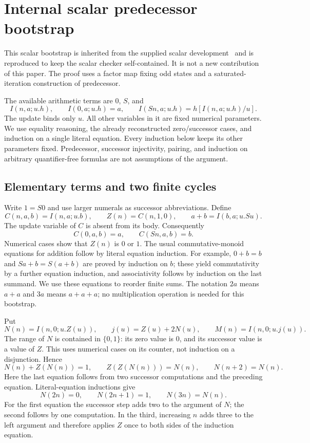 \documentclass[11pt,letterpaper]{article}
\theoremstyle{definition}\newtheorem{definition}[theorem]{Definition}
\theoremstyle{remark}\newtheorem{remark}[theorem]{Remark}
\begin{document}
\section{Internal scalar predecessor bootstrap}
\label{sec:hybrid-bootstrap}

This scalar bootstrap is inherited from the supplied scalar development~\cite{erasure} and is reproduced to keep the scalar checker self-contained. It is not a new contribution of this paper. The proof uses a factor map fixing odd states and a saturated-iteration construction of predecessor.

The available arithmetic terms are $0$, $S$, and
\[
 I(n,a;u.h),\qquad
 I(0,a;u.h)=a,\qquad
 I(Sn,a;u.h)=h[I(n,a;u.h)/u].
\]
The update binds only $u$.  All other variables in it are fixed numerical
parameters.  We use equality reasoning, the already reconstructed
zero/successor cases, and induction on a single literal equation.
Every induction below keeps its other parameters fixed.  Predecessor,
successor injectivity, pairing, and induction on arbitrary
quantifier-free formulas are not assumptions of the argument.

\subsection{Elementary terms and two finite cycles}

Write $1=S0$ and use larger numerals as successor abbreviations.  Define
\[
 C(n,a,b)=I(n,a;u.b),\qquad
 Z(n)=C(n,1,0),\qquad
 a+b=I(b,a;u.Su).
\]
The update variable of $C$ is absent from its body.  Consequently
\[
 C(0,a,b)=a,\qquad C(Sn,a,b)=b.
\]
Numerical cases show that $Z(n)$ is $0$ or $1$.
The usual commutative-monoid equations for addition follow by literal
equation induction.  For example, $0+b=b$ and $Sa+b=S(a+b)$ are
proved by induction on $b$; these yield commutativity by a further
equation induction, and associativity follows by induction on the last
summand.  We use these equations to reorder finite sums.  The notation
$2a$ means $a+a$ and $3a$ means $a+a+a$; no multiplication operation
is needed for this bootstrap.

Put
\[
 N(n)=I(n,0;u.Z(u)),\qquad
 j(u)=Z(u)+2N(u),\qquad
 M(n)=I(n,0;u.j(u)).
\]
The range of $N$ is contained in $\{0,1\}$: its zero value is $0$,
and its successor value is a value of $Z$.  This uses numerical cases
on its counter, not induction on a disjunction.  Hence
\begin{equation}
 N(n)+Z(N(n))=1,\qquad
 Z(Z(N(n)))=N(n),\qquad N(n+2)=N(n).
 \label{eq:hybrid-parity}
\end{equation}
Here the last equation follows from two successor computations and
the preceding equation.  Literal-equation inductions give
\begin{equation}
 N(2n)=0,\qquad N(2n+1)=1,\qquad N(3n)=N(n).
 \label{eq:hybrid-parity-scaling}
\end{equation}
For the first equation the successor step adds two to the argument of
$N$; the second follows by one computation.  In the third, increasing
$n$ adds three to the left argument and therefore applies $Z$ once to
both sides of the induction equation.
\end{document}
